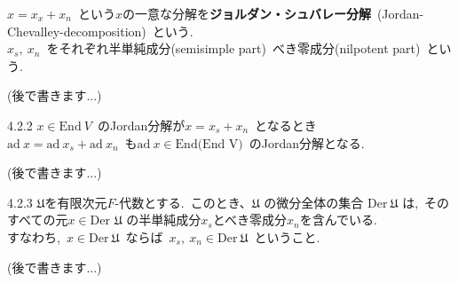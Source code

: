 \documentclass[uplatex,dvipdfmx]{jsarticle}
\begin{document}
$x=x_x+x_n$~という$x$の一意な分解を\textbf{ジョルダン・シュバレー分解}~(Jordan-Chevalley-decomposition)~という.\\
$x_s,~x_n$~をそれぞれ半単純成分(semisimple part)~べき零成分(nilpotent part)~という.
\begin{myproof}
    (後で書きます...)
\end{myproof}
\begin{mylemma}{4.2.2}
    $x\in \text{End}~V$~のJordan分解が$x=x_s + x_n$~となるとき\\
    $\text{ad}~x=\text{ad}~x_s + \text{ad}~x_n$~も$\text{ad}~x\in \text{End(End~V)}$~のJordan分解となる.
\end{mylemma}
\begin{myproof}
    (後で書きます...)
\end{myproof}
\begin{mylemma}{4.2.3}
    $\mathfrak{U}$を有限次元$F$-代数とする.~このとき、$\mathfrak{U}$ の微分全体の集合 $\text{Der}~\mathfrak{U}$ は,~そのすべての元$x\in \text{Der } \mathfrak{U}$ の半単純成分$x_s$とべき零成分$x_n$を含んでいる.\\
    すなわち,~$x\in \text{Der}~\mathfrak{U}$~ならば~$x_s,~x_n\in \text{Der}~\mathfrak{U}$~ということ.
\end{mylemma}
\begin{myproof}
    (後で書きます...)
\end{myproof}
\newpage
\end{document}
